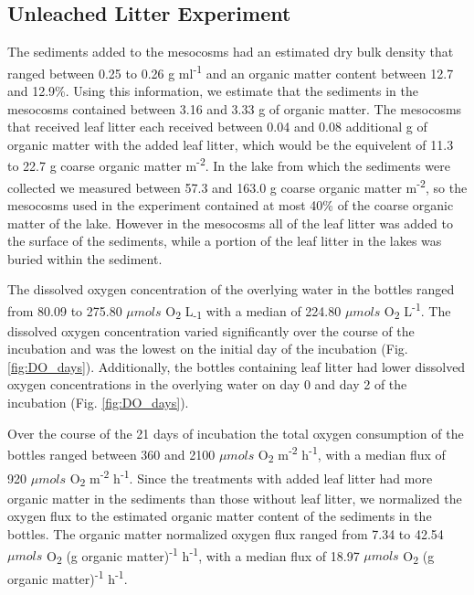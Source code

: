 \subsection{Unleached Litter Experiment}
The sediments added to the mesocosms had an estimated dry bulk density that ranged between 0.25 to 0.26 g ml\textsuperscript{-1} and an organic matter content between 12.7 and 12.9\%. Using this information, we estimate that the sediments in the mesocosms contained between 3.16 and 3.33 g of organic matter.  The mesocosms that received leaf litter each received between 0.04 and 0.08 additional g of organic matter with the added leaf litter, which would be the equivelent of 11.3 to 22.7 g coarse organic matter m\textsuperscript{-2}. In the lake from which the sediments were collected we measured between 57.3 and 163.0 g coarse organic matter m\textsuperscript{-2}, so the mesocosms used in the experiment contained at most 40\% of the coarse organic matter of the lake. However in the mesocosms all of the leaf litter was added to the surface of the sediments, while a portion of the leaf litter in the lakes was buried within the sediment.

The dissolved oxygen concentration of the overlying water in the bottles ranged from 80.09 to 275.80 $\mu mols$ O\textsubscript{2} L\textsubscript{-1} with a median of 224.80 $\mu mols$ O\textsubscript{2} L\textsuperscript{-1}.  The dissolved oxygen concentration varied significantly over the course of the incubation and was the lowest on the initial day of the incubation (Fig. \ref{fig:DO_days}). Additionally, the bottles containing leaf litter had lower dissolved oxygen concentrations in the overlying water on day 0 and day 2 of the incubation (Fig. \ref{fig:DO_days}).

Over the course of the 21 days of incubation the total oxygen consumption of the bottles ranged between 360 and 2100 $\mu mols$ O\textsubscript{2} m\textsuperscript{-2} h\textsuperscript{-1}, with a median flux of 920 $\mu mols$ O\textsubscript{2} m\textsuperscript{-2} h\textsuperscript{-1}. Since the treatments with added leaf litter had more organic matter in the sediments than those without leaf litter, we normalized the oxygen flux to the estimated organic matter content of the sediments in the bottles. The organic matter normalized oxygen flux ranged from 7.34 to 42.54 $\mu mols$ O\textsubscript{2} (g organic matter)\textsuperscript{-1} h\textsuperscript{-1}, with a median flux of 18.97 $\mu mols$ O\textsubscript{2} (g organic matter)\textsuperscript{-1} h\textsuperscript{-1}.

